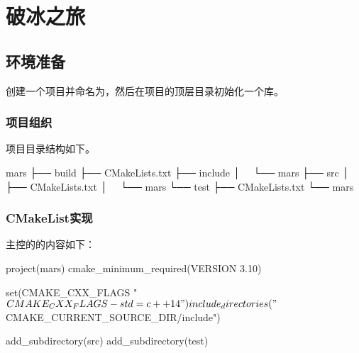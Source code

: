 \section{破冰之旅}

\begin{content}

\subsection{环境准备}

创建一个项目并命名为，然后在项目的顶层目录初始化一个库。

\begin{leftbar}
\end{leftbar}  

\subsubsection{项目组织}

项目目录结构如下。

\begin{leftbar}
 \begin{c++}[caption={\ttfamily{项目组织}}]
mars
├── build
├── CMakeLists.txt
├── include
│   └── mars
├── src
│   ├── CMakeLists.txt
│   └── mars
└── test
    ├── CMakeLists.txt
    └── mars
 \end{c++}
\end{leftbar}

\subsubsection{CMakeList实现}

主控的的内容如下：

\begin{leftbar}
 \begin{c++}[caption={\ttfamily{CMakeLists.txt}}]
project(mars)                                                                                  
cmake_minimum_required(VERSION 3.10)

set(CMAKE_CXX_FLAGS "${CMAKE_CXX_FLAGS} -std=c++14")

include_directories("${CMAKE_CURRENT_SOURCE_DIR}/include")

add_subdirectory(src)
add_subdirectory(test)
 \end{c++}
\end{leftbar}


\end{content}

